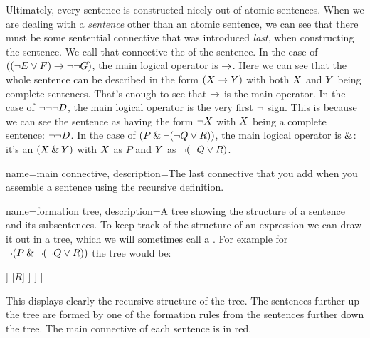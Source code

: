 Ultimately, every sentence is constructed nicely out of atomic sentences. When we are dealing with a \emph{sentence} other than an atomic sentence, we can see that there must be some sentential connective that was introduced \emph{last}, when constructing the sentence. We call that connective the  of the sentence.
 In the case of $((\neg E \vee F) \rightarrow \neg\neg G)$, the main logical operator is $\rightarrow$. Here we can see that the whole sentence can be described in the form $(X\rightarrow Y)$ with both $X$ and $Y$ being complete sentences. That's enough to see that $\rightarrow$ is the main operator. 
 In the case of $\neg\neg\neg D$, the main logical operator is the very first $\neg$ sign. This is because we can see the sentence as having the form $\neg X$ with $X$ being a complete sentence: $\neg\neg D$. In the case of $(P \mathbin{\&} \neg (\neg Q \vee R))$, the main logical operator is $\mathbin{\&}$: it's an $(X\mathbin{\&}Y)$ with $X$ as $P$ and $Y$ as $\neg (\neg Q \vee R)$. 

{
	name=main connective,
	description={The last connective that you add when you assemble a sentence using the recursive definition.}
}

{
	name=formation tree,
	description={A tree showing the structure of a sentence and its subsentences.}
}
To keep track of the structure of an expression we can draw it out in a tree, which we will sometimes call a . For example for $\neg (P \mathbin{\&} \neg (\neg Q \vee R))$ the tree would be:
\label{S:formationtree}

\begin{center}
\begin{forest}
	[$\textcolor{leadbeater}{\enot}\,  (P \eand \enot (\enot Q \eor R))$
		[$(P \,\textcolor{leadbeater}{\eand}\,  \enot (\enot Q \eor R))$
			[$P$]
			[$\textcolor{leadbeater}{\enot}\,   (\enot Q\eor R)$
				[$\textcolor{leadbeater}{\enot}\,   Q$
					[$Q$]
				]
				[$R$]
			]
		]
	]
\end{forest}
\end{center}

This displays clearly the recursive structure of the tree. The sentences further up the tree are formed by one of the formation rules from the sentences further down the tree. The main connective of each sentence is in red. 



